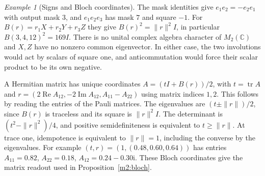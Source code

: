 \documentclass[11pt,reqno]{amsart}
\theoremstyle{definition}
\theoremstyle{remark}
\newtheorem{example}[theorem]{Example}
\numberwithin{equation}{section}
\newcommand{\C}{\mathbb{C}}
\newcommand{\re}{\operatorname{Re}}
\begin{document}
\begin{example}[Signs and Bloch coordinates]\label{m7:bloch}
The mask identities give $e_1e_2=-e_2e_1$ with output mask $3$, and
$e_1e_2e_3$ has mask $7$ and square $-1$. For
$B(r)=r_1X+r_2Y+r_3Z$ they give $B(r)^2=\|r\|^2 I$, in particular
$B(3,4,12)^2=169I$. There is no unital complex algebra character of
$M_2(\C)$ and $X,Z$ have no nonzero common eigenvector. In either
case, the two involutions would act by scalars of square one, and
anticommutation would force their scalar product to be its own
negative.

A Hermitian matrix has unique coordinates $A=(tI+B(r))/2$, with
$t=\operatorname{tr}A$ and
$r=(2\re A_{12},-2\operatorname{Im}A_{12},A_{11}-A_{22})$ using
matrix indices $1,2$. This follows by reading the entries
of the Pauli matrices. The eigenvalues are $(t\pm\|r\|)/2$,
since $B(r)$ is traceless and its square is $\|r\|^2 I$.
The determinant is $(t^2-\|r\|^2)/4$, and positive semidefiniteness is equivalent
to $t\ge\|r\|$. At trace one, idempotence is equivalent to $\|r\|=1$,
including the converse by the eigenvalues. For example
$(t,r)=(1,(0.48,0.60,0.64))$ has entries
$A_{11}=0.82$, $A_{22}=0.18$, $A_{12}=0.24-0.30\mathrm i$.
These Bloch coordinates give the matrix readout used in
Proposition~\ref{m2:bloch}.
\end{example}
\end{document}
